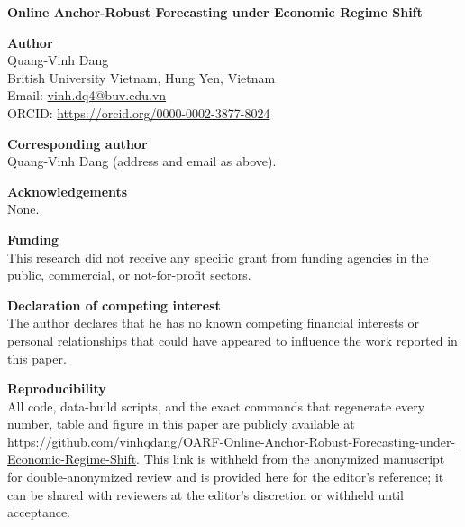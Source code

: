 \documentclass[11pt]{article}
\begin{document}
\thispagestyle{empty}

\begin{center}
{\Large\bfseries Online Anchor-Robust Forecasting under Economic Regime Shift}
\end{center}

\bigskip
\noindent\textbf{Author}\\
Quang-Vinh Dang\\
British University Vietnam, Hung Yen, Vietnam\\
Email: \href{mailto:vinh.dq4@buv.edu.vn}{vinh.dq4@buv.edu.vn}\\
ORCID: \url{https://orcid.org/0000-0002-3877-8024}

\bigskip
\noindent\textbf{Corresponding author}\\
Quang-Vinh Dang (address and email as above).

\bigskip
\noindent\textbf{Acknowledgements}\\
None.

\bigskip
\noindent\textbf{Funding}\\
This research did not receive any specific grant from funding agencies in the
public, commercial, or not-for-profit sectors.

\bigskip
\noindent\textbf{Declaration of competing interest}\\
The author declares that he has no known competing financial interests or
personal relationships that could have appeared to influence the work reported
in this paper.

\bigskip
\noindent\textbf{Reproducibility}\\
All code, data-build scripts, and the exact commands that regenerate every
number, table and figure in this paper are publicly available at
\url{https://github.com/vinhqdang/OARF-Online-Anchor-Robust-Forecasting-under-Economic-Regime-Shift}.
This link is withheld from the anonymized manuscript for double-anonymized
review and is provided here for the editor's reference; it can be shared with
reviewers at the editor's discretion or withheld until acceptance.
\end{document}
